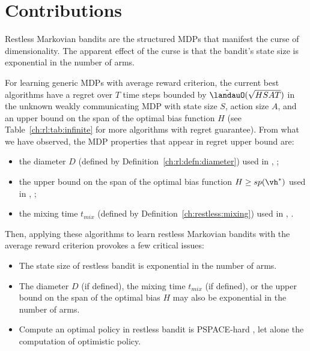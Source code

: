 \section{Contributions}
\label{ch:restless:contribute}

Restless Markovian bandits are the structured MDPs that manifest the curse of dimensionality.
The apparent effect of the curse is that the bandit's state size is exponential in the number of arms.

For learning generic MDPs with average reward criterion, the current best algorithms have a regret over $T$ time steps bounded by $\tilde{\landauO}(\sqrt{HSAT})$ in the unknown weakly communicating MDP with state size $S$, action size $A$, and an upper bound on the span of the optimal bias function $H$ (see Table~\ref{ch:rl:tab:infinite} for more algorithms with regret guarantee).
From what we have observed, the MDP properties that appear in regret upper bound are:
\begin{itemize}
    \item the diameter $D$ (defined by Definition~\ref{ch:rl:defn:diameter}) used in \eg, \cite{jaksch2010near, fruit2020improved, tossou2019near};
    \item the upper bound on the span of the optimal bias function $H\ge sp(\vh^*)$ used in \eg, \cite{bartlett2012regal, ouyang2017learning, fruit2018efficient, zhang2019regret};
    \item the mixing time $t_{mix}$ (defined by Definition~\ref{ch:restless:mixing}) used in \eg, \cite{ortner2020regret}.
\end{itemize}
Then, applying these algorithms to learn restless Markovian bandits with the average reward criterion provokes a few critical issues:
\begin{itemize}
    \item The state size of restless bandit is exponential in the number of arms.
    \item The diameter $D$ (if defined), the mixing time $t_{mix}$ (if defined), or the upper bound on the span of the optimal bias $H$ may also be exponential in the number of arms.
    \item Compute an optimal policy in restless bandit is PSPACE-hard \cite{papadimitriou1994complexity}, let alone the computation of optimistic policy.
\end{itemize}
